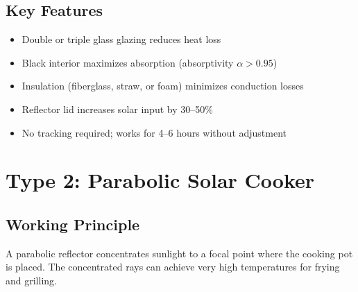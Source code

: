 \documentclass[11pt]{article}
\begin{document}
\subsection{Key Features}
\begin{itemize}
    \item Double or triple glass glazing reduces heat loss
    \item Black interior maximizes absorption (absorptivity $\alpha > 0.95$)
    \item Insulation (fiberglass, straw, or foam) minimizes conduction losses
    \item Reflector lid increases solar input by 30--50\%
    \item No tracking required; works for 4--6 hours without adjustment
\end{itemize}

\newpage
\section{Type 2: Parabolic Solar Cooker}

\subsection{Working Principle}
A parabolic reflector concentrates sunlight to a focal point where the cooking pot is placed. The concentrated rays can achieve very high temperatures for frying and grilling.
\end{document}
